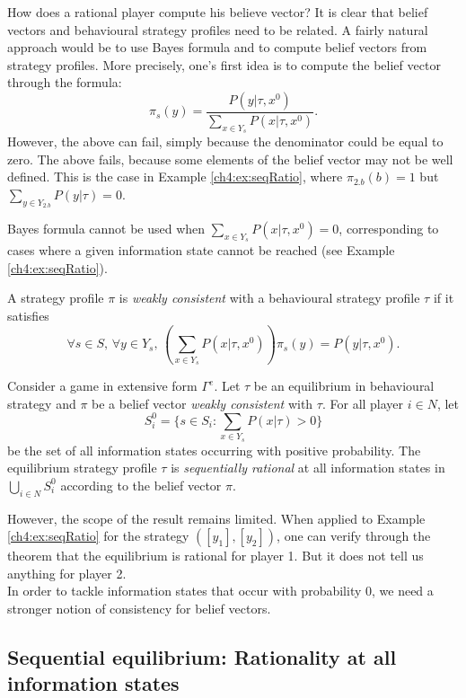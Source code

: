 How does a rational player compute his believe vector?
It is clear that belief vectors and behavioural strategy profiles need to be related. A fairly natural approach  would be to use Bayes formula and to compute belief vectors from strategy profiles.
More precisely, one's first idea is to compute the belief vector through the formula:
$$ \pi_s(y) = \frac{P(y | \tau, x^0)}{\sum_{x \in Y_s} P(x | \tau, x^0)}. $$
However, the above can fail, simply because the denominator could be equal to zero. The above fails, because some elements of the belief vector may not be well defined. This is the case in Example \ref{ch4:ex:seqRatio}, where $\pi_{2.b}(b) = 1$ but  $ \sum_{y \in Y_{2.b}} P(y | \tau) = 0$.

Bayes formula cannot be used when $\sum_{x \in Y_s} P(x | \tau, x^0) = 0$, corresponding to cases where a given information state cannot be reached (see Example \ref{ch4:ex:seqRatio}).

\begin{definition}
A strategy profile $\pi$ is \emph{weakly consistent} with a behavioural strategy profile $\tau$  if it
satisfies
$$\forall s \in S, \, \forall y \in Y_s, \, \left (\sum_{x \in Y_s} P(x | \tau, x^0)\right ) \pi_s(y) =  P(y | \tau, x^0).$$
\end{definition}

\begin{theorem}
Consider a game in extensive form $\Gamma^e$. Let $\tau$ be an equilibrium in behavioural strategy and $\pi$ be a belief vector \emph{weakly consistent} with $\tau$.
For all player $i \in N$, let
$$
S^0_i = \{s \in S_i : \sum_{x \in Y_s} P(x| \tau) > 0\}
$$
be the set of all information states occurring with positive probability.
The equilibrium strategy profile $\tau$ is \emph{sequentially rational} at all information states in $\bigcup_{i \in N} S^0_i$ according to the belief vector $\pi$.
\label{ch4:th:WeakRatio}
\end{theorem}

However, the scope of the result remains limited. When applied to Example \ref{ch4:ex:seqRatio} for the strategy $([y_1],[y_2])$, one can verify through the theorem that the equilibrium is rational for player 1. But it does not tell us anything for player 2.\\
In order to tackle information states that occur with probability 0, we need a stronger notion of consistency for belief vectors.

\subsection{Sequential equilibrium: Rationality at all information states}

